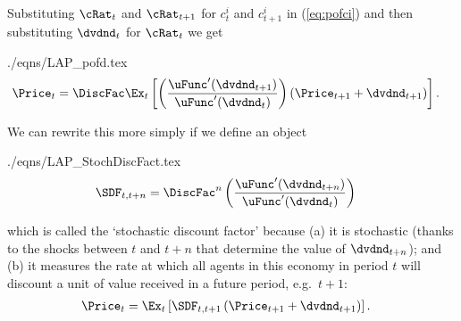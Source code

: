 \documentclass{handout}
\begin{document}
\hypertarget{pofd}{}
Substituting $\cRat_{t}$ and $\cRat_{t+1}$ for $c_{t}^{i}$ and $c_{t+1}^{i}$ in  (\ref{eq:pofci}) and then
substituting $\dvdnd_{t}$ for $\cRat_{t}$ we get
\begin{verbatimwrite}{./eqns/LAP_pofd.tex}
\begin{equation}\begin{gathered}\begin{aligned}
 \Price_{t} & =  \DiscFac \Ex_{t}\left[\left(\frac{\uFunc^{\prime}(\dvdnd_{t+1})}{\uFunc^{\prime}(\dvdnd_{t})}\right)\left({\Price}_{t+1}+\dvdnd_{t+1}\right)\right] \label{eq:pofd}.
\end{aligned}\end{gathered}\end{equation}
\end{verbatimwrite}



We can rewrite this more simply if we define an object
\begin{verbatimwrite}{./eqns/LAP_StochDiscFact.tex}
\begin{equation}\begin{gathered}\begin{aligned}
  \label{eq:StochDiscFact}
  \SDF_{t,t+n} & =  \DiscFac^{n} \left(\frac{\uFunc^{\prime}(\dvdnd_{t+n})}{\uFunc^{\prime}(\dvdnd_{t})}\right)
\end{aligned}\end{gathered}\end{equation}
\end{verbatimwrite}

which is called the `stochastic discount factor' because (a) it is stochastic (thanks to the shocks between $t$ and $t+n$ that determine the value of $\dvdnd_{t+n}$); and (b) it measures the rate at which all agents in this economy in period $t$ will discount a unit of value received in a future period, e.g.\ $t+1$: \hypertarget{Pt}{}
\begin{equation}\begin{gathered}\begin{aligned}
 \Price_{t} & =  \Ex_{t}\left[\SDF_{t,t+1}\left({\Price}_{t+1}+\dvdnd_{t+1}\right)\right] . \label{eq:Pt}
\end{aligned}\end{gathered}\end{equation}
\end{document}
